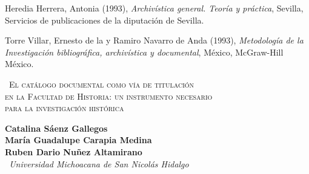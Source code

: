 \bigskip
{}

\medskip 
\noindent Heredia Herrera, Antonia (1993), \textit{Archivística 
general. Teoría y práctica}, Sevilla, Servicios de publicaciones de la 
diputación de Sevilla. 

\noindent Torre Villar, Ernesto de la y Ramiro Navarro de Anda (1993),  \textit{ 
Metodología de la Investigación bibliográfica, archivística y  documental}, México, McGraw-Hill México.
\newpage
\thispagestyle{empty}
\phantom{abc}

\thispagestyle{empty}

\begin{center}
{\scshape\ \large El catálogo documental como vía de 
titulación\\ en la Facultad de Historia: un instrumento necesario\\ para la investigación histórica}
\end{center}
\setcounter{footnote}{0}

\bigskip
\begin{center}
{\bfseries Catalina Sáenz Gallegos\\
María Guadalupe Carapia Medina\\
Ruben Dario Nuñez Altamirano}\\
{\itshape\ Universidad Michoacana de San Nicolás Hidalgo\/}
\end{center}

\bigskip
{}

